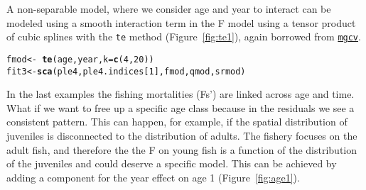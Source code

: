 \documentclass[a4paper,english,10pt]{article}\usepackage[]{graphicx}\usepackage[]{color}
\makeatletter
\newcommand{\hlnum}[1]{\textcolor[rgb]{0.686,0.059,0.569}{#1}}%
\newcommand{\hlopt}[1]{\textcolor[rgb]{0,0,0}{#1}}%
\newcommand{\hlstd}[1]{\textcolor[rgb]{0.345,0.345,0.345}{#1}}%
\newcommand{\hlkwb}[1]{\textcolor[rgb]{0.69,0.353,0.396}{#1}}%
\newcommand{\hlkwc}[1]{\textcolor[rgb]{0.333,0.667,0.333}{#1}}%
\newcommand{\hlkwd}[1]{\textcolor[rgb]{0.737,0.353,0.396}{\textbf{#1}}}%
\newenvironment{kframe}{%
 \def\at@end@of@kframe{}%
 \ifinner\ifhmode%
  \def\at@end@of@kframe{\end{minipage}}%
  \begin{minipage}{\columnwidth}%
 \fi\fi%
 \def\FrameCommand##1{\hskip\@totalleftmargin \hskip-\fboxsep
 \colorbox{shadecolor}{##1}\hskip-\fboxsep
     \hskip-\linewidth \hskip-\@totalleftmargin \hskip\columnwidth}%
 \MakeFramed {\advance\hsize-\width
   \@totalleftmargin\z@ \linewidth\hsize
   \@setminipage}}%
 {\par\unskip\endMakeFramed%
 \at@end@of@kframe}
\newenvironment{knitrout}{}{} %
\newcommand{\code}[1]{{\texttt{#1}}}
\newcommand{\pkg}[1]{{\texttt{#1}}}
\makeatother
\begin{document}
\begin{knitrout}
\color{fgcolor}\begin{kframe}


{\ttfamily\noindent\bfseries{}}\end{kframe}
\end{knitrout}

A non-separable model, where we consider age and year to interact can be modeled using a smooth interaction term in the F model using a tensor product of cubic splines with the \code{te} method (Figure~\ref{fig:te1}), again borrowed from \href{http://cran.r-project.org/web/packages/mgcv/index.html}{\pkg{mgcv}}. 

\begin{knitrout}
\color{fgcolor}\begin{kframe}
\begin{alltt}
\hlstd{fmod} \hlkwb{<-} \hlopt{~} \hlkwd{te}\hlstd{(age, year,} \hlkwc{k} \hlstd{=} \hlkwd{c}\hlstd{(}\hlnum{4}\hlstd{,}\hlnum{20}\hlstd{))}
\hlstd{fit3} \hlkwb{<-} \hlkwd{sca}\hlstd{(ple4, ple4.indices[}\hlnum{1}\hlstd{], fmod, qmod, srmod)}
\end{alltt}


{\ttfamily\noindent\bfseries{}}\end{kframe}
\end{knitrout}

\begin{knitrout}
\color{fgcolor}\begin{kframe}


{\ttfamily\noindent\bfseries{}}\end{kframe}
\end{knitrout}

In the last examples the fishing mortalities (Fs') are linked across age and time.  What if we want to free up a specific age class because in the residuals we see a consistent pattern.  This can happen, for example, if the spatial distribution of juveniles is disconnected to the distribution of adults.  The fishery focuses on the adult fish, and therefore the the F on young fish is a function of the distribution of the juveniles and could deserve a specific model. This can be achieved by adding a component for the year effect on age 1 (Figure~\ref{fig:age1}).
\end{document}
